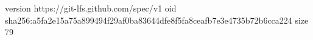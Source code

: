 version https://git-lfs.github.com/spec/v1
oid sha256:a5fa2e15a75a899494f29af0ba83644dfe8f5fa8ceafb7e3e4735b72b6cca224
size 79
